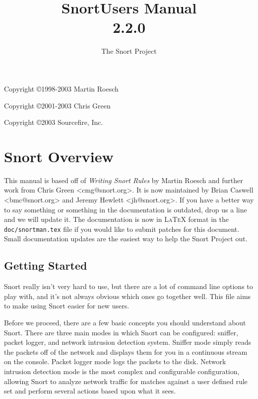 \documentclass[english]{report}
\begin{document}
\title{Snort\texttrademark  Users Manual\\  2.2.0 }

\author{The Snort Project}

\maketitle

\newpage

Copyright \copyright 1998-2003 Martin Roesch

Copyright \copyright 2001-2003 Chris Green

Copyright \copyright 2003 Sourcefire, Inc.

\tableofcontents{}


\chapter{Snort Overview}

This manual is based off of \emph{Writing Snort Rules} by Martin Roesch and
further work from Chris Green <cmg@snort.org>.  It is now maintained by Brian
Caswell <bmc@snort.org> and Jeremy Hewlett <jh@snort.org>.  If you have a
better way to say something or something in the documentation is outdated, drop
us a line and we will update it.  The documentation is now in \textsc{LaTeX}
format in the \verb!doc/snortman.tex! file if you would like to submit patches
for this document.  Small documentation updates are the easiest way to help the
Snort Project out.

\section{Getting Started}

Snort really isn't very hard to use, but there are a lot of command line
options to play with, and it's not always obvious which ones go together well.
This file aims to make using Snort easier for new users.

Before we proceed, there are a few basic concepts you should understand about
Snort. There are three main modes in which Snort can be configured: sniffer,
packet logger, and network intrusion detection system. Sniffer mode simply
reads the packets off of the network and displays them for you in a continuous
stream on the console. Packet logger mode logs the packets to the disk. Network
intrusion detection mode is the most complex and configurable configuration,
allowing Snort to analyze network traffic for matches against a user defined
rule set and perform several actions based upon what it sees.
\end{document}

